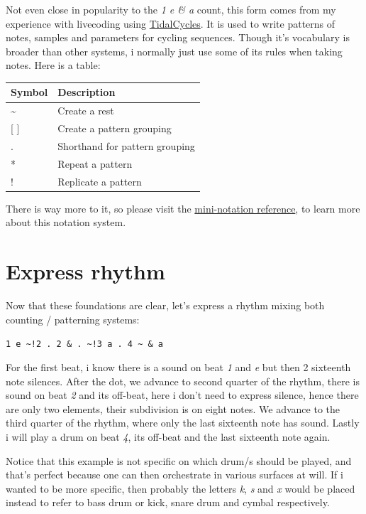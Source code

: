 \documentclass[
]{book}
\begin{document}
Not even close in popularity to the \emph{1 e \& a} count, this form comes from my experience with livecoding using \href{https://tidalcycles.org/}{TidalCycles}. It is used to write patterns of notes, samples and parameters for cycling sequences. Though it's vocabulary is broader than other systems, i normally just use some of its rules when taking notes. Here is a table:

\begin{longtable}[]{@{}ll@{}}
\toprule
Symbol & Description \\
\midrule
\endhead
\textasciitilde{} & Create a rest \\
{[} {]} & Create a pattern grouping \\
. & Shorthand for pattern grouping \\
* & Repeat a pattern \\
! & Replicate a pattern \\
\bottomrule
\end{longtable}

There is way more to it, so please visit the \href{https://tidalcycles.org/docs/reference/mini_notation}{mini-notation reference}, to learn more about this notation system.

\hypertarget{express-rhythm}{%
\section*{Express rhythm}\label{express-rhythm}}

Now that these foundations are clear, let's express a rhythm mixing both counting / patterning systems:

\texttt{1\ e\ \textasciitilde{}!2\ .\ 2\ \&\ .\ \textasciitilde{}!3\ a\ .\ 4\ \textasciitilde{}\ \&\ a}

For the first beat, i know there is a sound on beat \emph{1} and \emph{e} but then 2 sixteenth note silences. After the dot, we advance to second quarter of the rhythm, there is sound on beat \emph{2} and its off-beat, here i don't need to express silence, hence there are only two elements, their subdivision is on eight notes. We advance to the third quarter of the rhythm, where only the last sixteenth note has sound. Lastly i will play a drum on beat \emph{4}, its off-beat and the last sixteenth note again.

Notice that this example is not specific on which drum/s should be played, and that's perfect because one can then orchestrate in various surfaces at will. If i wanted to be more specific, then probably the letters \emph{k}, \emph{s} and \emph{x} would be placed instead to refer to bass drum or kick, snare drum and cymbal respectively.
\end{document}
